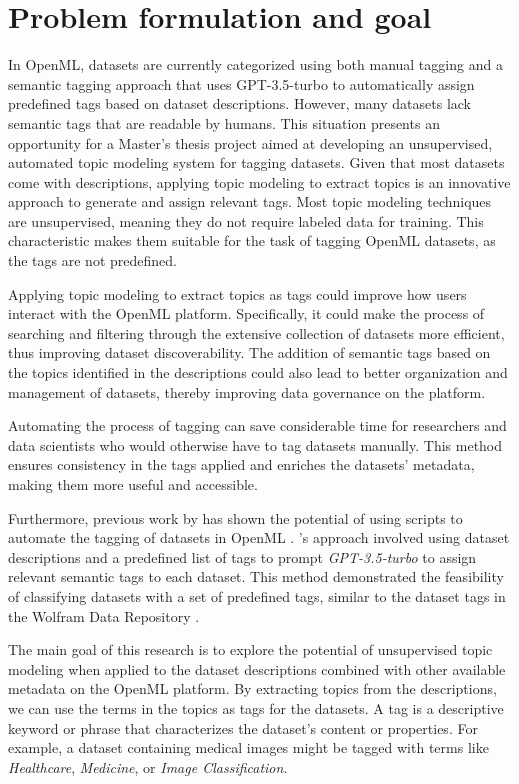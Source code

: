 \section{Problem formulation and goal}
In OpenML, datasets are currently categorized using both manual tagging and a semantic tagging approach that uses GPT-3.5-turbo to automatically assign predefined tags based on dataset descriptions. However, many datasets lack semantic tags that are readable by humans. This situation presents an opportunity for a Master's thesis project aimed at developing an unsupervised, automated topic modeling system for tagging datasets. Given that most datasets come with descriptions, applying topic modeling to extract topics is an innovative approach to generate and assign relevant tags. Most topic modeling techniques are unsupervised, meaning they do not require labeled data for training. This characteristic makes them suitable for the task of tagging OpenML datasets, as the tags are not predefined.

Applying topic modeling to extract topics as tags could improve how users interact with the OpenML platform. Specifically, it could make the process of searching and filtering through the extensive collection of datasets more efficient, thus improving dataset discoverability. The addition of semantic tags based on the topics identified in the descriptions could also lead to better organization and management of datasets, thereby improving data governance on the platform.

Automating the process of tagging can save considerable time for researchers and data scientists who would otherwise have to tag datasets manually. This method ensures consistency in the tags applied and enriches the datasets' metadata, making them more useful and accessible.

Furthermore, previous work by \citeauthor{das_openmlscripts_nodate} has shown the potential of using scripts to automate the tagging of datasets in OpenML \cite{das_openmlscripts_nodate}. \citeauthor{das_openmlscripts_nodate}'s approach involved using dataset descriptions and a predefined list of tags to prompt \textit{GPT-3.5-turbo} to assign relevant semantic tags to each dataset. This method demonstrated the feasibility of classifying datasets with a set of predefined tags, similar to the dataset tags in the Wolfram Data Repository \cite{noauthor_wolfram_nodate}.

The main goal of this research is to explore the potential of unsupervised topic modeling when applied to the dataset descriptions combined with other available metadata on the OpenML platform. By extracting topics from the descriptions, we can use the terms in the topics as tags for the datasets. A tag is a descriptive keyword or phrase that characterizes the dataset's content or properties. For example, a dataset containing medical images might be tagged with terms like \textit{Healthcare}, \textit{Medicine}, or \textit{Image Classification}.


